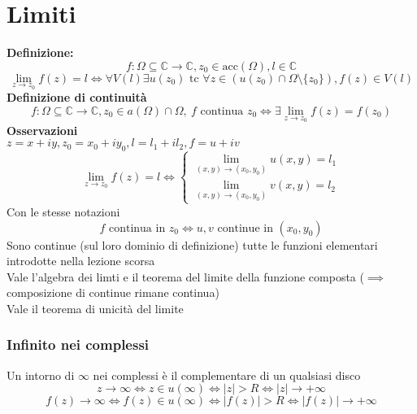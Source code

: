 \documentclass[a4paper]{article}
\newcommand{\C}{\mathbb{C}}
\begin{document}
\section{Limiti}
\textbf{Definizione: } \[f:\Omega\subseteq\C\to \C, z_0\in \text{acc}(\Omega),l\in\C\]
\[\lim_{z \to z_0} f(z)=l\iff\forall V(l)\exists
u(z_0) \text{ tc }\forall z\in (u(z_0) \cap \Omega\setminus\{z_0\}), f(z)\in V(l)\]
\textbf{Definizione di continuità}
\[f:\Omega\subseteq\C\to \C, z_0\in a(\Omega)\cap \Omega,\  f \text{ continua } z_0 \iff\exists \lim_{z \to z_0} f(z)=f(z_0)\]
\textbf{Osservazioni}
\\$z=x+iy, z_0=x_0+iy_0, l=l_1+il_2, f=u+iv$
\[\lim_{z \to z_0} f(z)=l\iff 
\begin{cases}	
	\lim_{(x,y) \to (x_0,y_0)} u(x,y)=l_1\\ 
	\lim_{(x,y) \to (x_0,y_0)} v(x,y)=l_2
\end{cases}
\]
Con le stesse notazioni
\[f \text{ continua in }z_0\iff u,v \text{ continue in } (x_0,y_0)\]
Sono continue (sul loro dominio di definizione) tutte le funzioni elementari introdotte nella lezione scorsa
\\Vale l'algebra dei limti e il teorema del limite della funzione composta ($\implies$ composizione di continue rimane continua)
\\Vale il teorema di unicità del limite
\subsubsection{Infinito nei complessi}
Un intorno di $\infty$ nei complessi è il complementare di un qualsiasi disco
\[z\to \infty \iff z\in u(\infty)\iff |z|>R\iff |z|\to +\infty\]
\[f(z)\to \infty \iff f(z)\in u(\infty) \iff |f(z)|>R \iff |f(z)|\to +\infty\]
\end{document}
